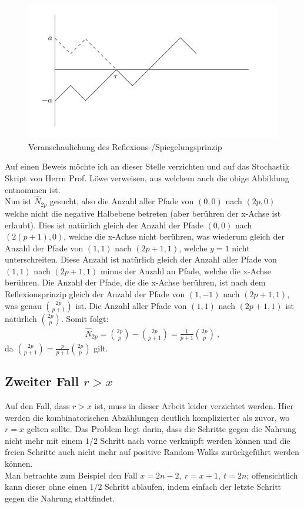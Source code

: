 \documentclass[a4paper, 12pt]{report}
\begin{document}
\begin{figure}[H]
	\centering
	\includegraphics[scale=0.5]{spiegelungsprinzip.png}
	\caption{Veranschaulichung des Reflexions-/Spiegelungsprinzip}
\end{figure}

\noindent Auf einen Beweis möchte ich an dieser Stelle verzichten und auf das Stochastik Skript von Herrn Prof. Löwe \cite{Stoch} verweisen, aus welchem auch die obige Abbildung entnommen ist.
\\
Nun ist $\hat{N}_{2p}$ gesucht, also die Anzahl aller Pfade von $(0,0)$ nach $(2p,0)$ welche nicht die negative Halbebene betreten (aber berühren der x-Achse ist erlaubt). Dies ist natürlich gleich der Anzahl der Pfade $(0,0)$ nach $(2(p+1),0)$, welche die x-Achse nicht berühren, was wiederum gleich der Anzahl der Pfade von $(1,1)$ nach $(2p+1,1)$, welche $y=1$ nicht unterschreiten. Diese Anzahl ist natürlich gleich der Anzahl aller Pfade von $(1,1)$ nach $(2p+1,1)$ minus der Anzahl an Pfade, welche die x-Achse berühren. Die Anzahl der Pfade, die die x-Achse berühren, ist nach dem Reflexionsprinzip gleich der Anzahl der Pfade von $(1,-1)$ nach $(2p+1,1)$, was genau $2p \choose p+1$ ist. Die Anzahl aller Pfade von $(1,1)$ nach $(2p+1,1)$ ist natürlich $2p \choose p$. Somit folgt:
\begin{align}
\hat{N}_{2p}={2p \choose p} - {2p \choose p+1}=\frac{1}{p+1}{2p \choose p}\ ,
\end{align}
da ${2p \choose p+1} = \frac{p}{p+1} {2p \choose p}$ gilt.
\subsection{Zweiter Fall $r>x$}
Auf den Fall, dass $r>x$ ist, muss in dieser Arbeit leider verzichtet werden. Hier werden die kombinatorischen Abzählungen deutlich komplizierter als zuvor, wo $r=x$ gelten sollte. Das Problem liegt darin, dass die Schritte gegen die Nahrung nicht mehr mit einem $1/2$ Schritt nach vorne verknüpft werden können und die freien Schritte auch nicht mehr auf positive Random-Walks zurückgeführt werden können.
\\
Man betrachte zum Beispiel den Fall $x= 2n-2,\ r=x+1,\ t=2n$; offensichtlich kann dieser ohne einen $1/2$ Schritt ablaufen, indem einfach der letzte Schritt gegen die Nahrung stattfindet.
 
\end{document}
